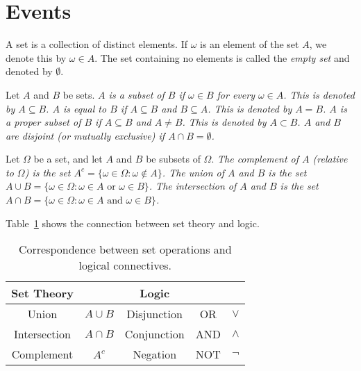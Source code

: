 
\section{Events}\label{sec:events}

A set is a collection of distinct elements. If $\omega$ is an element of the set $A$, we denote this by $\omega\in A$.
The set containing no elements is called the \emph{empty set} and denoted by $\emptyset$.
  
\begin{definition}
Let $A$ and $B$ be sets.
\ben
\it $A$ is a \emph{subset} of $B$ if $\omega\in B$ for every $\omega\in A$. This is denoted by $A\subseteq B$.
\it $A$ is \emph{equal} to $B$ if $A\subseteq B$ and $B\subseteq A$. This is denoted by $A=B$.
\it $A$ is a \emph{proper subset} of $B$ if $A\subseteq B$ and $A\neq B$. This is denoted by $A\subset B$.
\it $A$ and $B$ are \emph{disjoint} (or \emph{mutually exclusive}) if $A\cap B=\emptyset$.
\een
\end{definition}

\begin{definition}
Let $\Omega$ be a set, and let $A$ and $B$ be subsets of $\Omega$.
\ben
\it The \emph{complement} of $A$ (relative to $\Omega$) is the set 
$A^c=\{\omega\in\Omega:\omega\notin A\}$.
\it The \emph{union} of $A$ and $B$ is the set 
$A\cup B = \{\omega\in\Omega: \omega\in A \text{ or }\omega\in B\}$.
\it The \emph{intersection} of $A$ and $B$ is the set
$A\cap B = \{\omega\in\Omega: \omega\in A \text{ and }\omega\in B\}$.
\een
\end{definition}

Table~\ref{tab:sets_and_logic} shows the connection between set theory and logic.
\begin{table}[ht]
\centering
\begin{tabular}{|c|c||c|c|c|} \hline
Set Theory 		& 			& Logic			&		& \\ \hline
Union			& $A\cup B$	& Disjunction 	& OR 	& $\lor$	\\
Intersection	& $A\cap B$	& Conjunction	& AND 	& $\land$\\
Complement		& $A^c$		& Negation		& NOT 	& $\lnot$	\\ \hline
\end{tabular}
\caption{Correspondence between set operations and logical connectives.\label{tab:sets_and_logic}}
\end{table}

